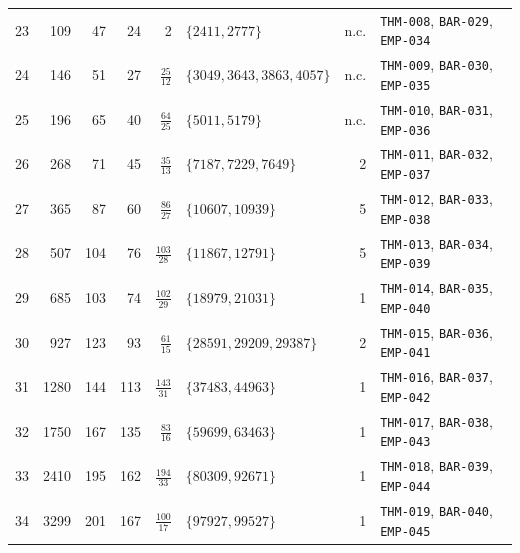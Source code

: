 \begin{longtable}{rrrrrL{3.3cm}rL{2.5cm}}
23 & 109 & 47 & 24 & 2 & \(\{2411,2777\}\) & n.c. & \texttt{THM-008}, \texttt{BAR-029}, \texttt{EMP-034} \\
24 & 146 & 51 & 27 & \(\frac{25}{12}\) & \(\{3049,3643,3863,4057\}\) & n.c. & \texttt{THM-009}, \texttt{BAR-030}, \texttt{EMP-035} \\
25 & 196 & 65 & 40 & \(\frac{64}{25}\) & \(\{5011,5179\}\) & n.c. & \texttt{THM-010}, \texttt{BAR-031}, \texttt{EMP-036} \\
26 & 268 & 71 & 45 & \(\frac{35}{13}\) & \(\{7187,7229,7649\}\) & 2 & \texttt{THM-011}, \texttt{BAR-032}, \texttt{EMP-037} \\
27 & 365 & 87 & 60 & \(\frac{86}{27}\) & \(\{10607,10939\}\) & 5 & \texttt{THM-012}, \texttt{BAR-033}, \texttt{EMP-038} \\
28 & 507 & 104 & 76 & \(\frac{103}{28}\) & \(\{11867,12791\}\) & 5 & \texttt{THM-013}, \texttt{BAR-034}, \texttt{EMP-039} \\
29 & 685 & 103 & 74 & \(\frac{102}{29}\) & \(\{18979,21031\}\) & 1 & \texttt{THM-014}, \texttt{BAR-035}, \texttt{EMP-040} \\
30 & 927 & 123 & 93 & \(\frac{61}{15}\) & \(\{28591,29209,29387\}\) & 2 & \texttt{THM-015}, \texttt{BAR-036}, \texttt{EMP-041} \\
31 & 1280 & 144 & 113 & \(\frac{143}{31}\) & \(\{37483,44963\}\) & 1 & \texttt{THM-016}, \texttt{BAR-037}, \texttt{EMP-042} \\
32 & 1750 & 167 & 135 & \(\frac{83}{16}\) & \(\{59699,63463\}\) & 1 & \texttt{THM-017}, \texttt{BAR-038}, \texttt{EMP-043} \\
33 & 2410 & 195 & 162 & \(\frac{194}{33}\) & \(\{80309,92671\}\) & 1 & \texttt{THM-018}, \texttt{BAR-039}, \texttt{EMP-044} \\
34 & 3299 & 201 & 167 & \(\frac{100}{17}\) & \(\{97927,99527\}\) & 1 & \texttt{THM-019}, \texttt{BAR-040}, \texttt{EMP-045} \\
\bottomrule
\end{longtable}
\endgroup
